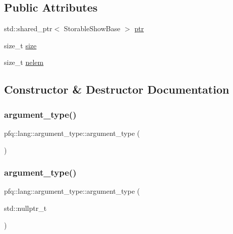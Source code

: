 \subsection*{Public Attributes}
\begin{DoxyCompactItemize}
\item 
std\+::shared\+\_\+ptr$<$ Storable\+Show\+Base $>$ \hyperlink{structpfq_1_1lang_1_1argument__type_a5b291ef1d2a04a9e238ad29643a77830}{ptr}
\item 
size\+\_\+t \hyperlink{structpfq_1_1lang_1_1argument__type_ae5d502317434728683578c32b6056275}{size}
\item 
size\+\_\+t \hyperlink{structpfq_1_1lang_1_1argument__type_ac0016fd1fba8c2cb6922093a9561473f}{nelem}
\end{DoxyCompactItemize}


\subsection{Constructor \& Destructor Documentation}
\mbox{\label{structpfq_1_1lang_1_1argument__type_aa89bbfb7ed7487d09512e29bc8df723a}} 
\subsubsection{\texorpdfstring{argument\+\_\+type()}{argument\_type()}\hspace{0.1cm}{\footnotesize\ttfamily [1/10]}}
{\footnotesize\ttfamily pfq\+::lang\+::argument\+\_\+type\+::argument\+\_\+type (\begin{DoxyParamCaption}{ }\end{DoxyParamCaption})\hspace{0.3cm}{\ttfamily [inline]}}

\mbox{\label{structpfq_1_1lang_1_1argument__type_aaa36abcce4c5e2418fc5a10328619a2d}} 
\subsubsection{\texorpdfstring{argument\+\_\+type()}{argument\_type()}\hspace{0.1cm}{\footnotesize\ttfamily [2/10]}}
{\footnotesize\ttfamily pfq\+::lang\+::argument\+\_\+type\+::argument\+\_\+type (\begin{DoxyParamCaption}\item[{std\+::nullptr\+\_\+t}]{ }\end{DoxyParamCaption})\hspace{0.3cm}{\ttfamily [inline]}}

